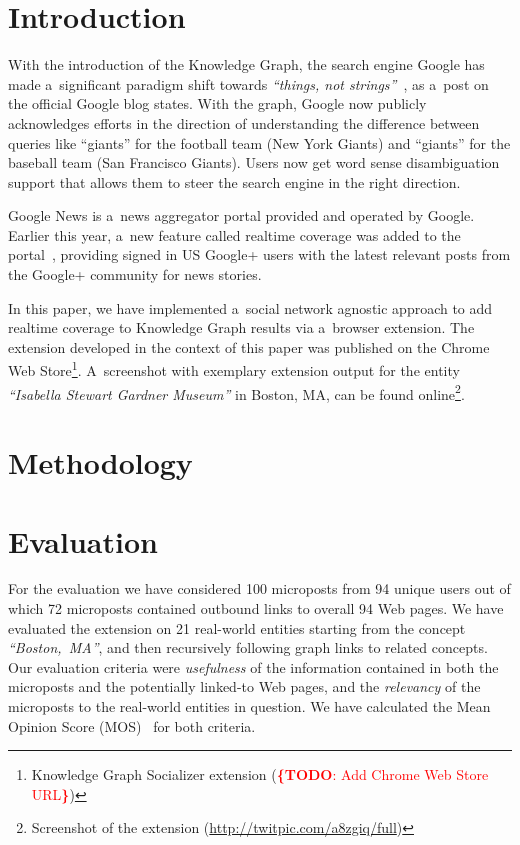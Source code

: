 \documentclass[runningheads,a4paper]{llncs}
\newcommand{\todo}[1]{\noindent\textcolor{red}{{\bf \{TODO}: #1{\bf \}}}}
\begin{document}
\section{Introduction}
With the introduction of the Knowledge Graph, the search engine Google
has made a~significant paradigm shift towards \textit{``things, not strings''}~\cite{singhal2012},
as a~post on the official Google blog states.
With the graph, Google now publicly acknowledges efforts in the direction of 
understanding the difference between queries like ``giants''
for the football team (New York Giants)
and ``giants'' for the baseball team (San Francisco Giants).
Users now get word sense disambiguation support that allows them
to steer the search engine in the right direction.

Google News is a~news aggregator portal provided and operated by Google.
Earlier this year, a~new feature called realtime coverage
was added to the portal~\cite{zuccarino2012}, providing signed in US Google+ users
with the latest relevant posts from the Google+ community for news stories.

In this paper, we have implemented a~social network agnostic approach
to add realtime coverage to Knowledge Graph results via a~browser extension.
The extension developed in the context of this paper was published
on the Chrome Web Store\footnote{Knowledge Graph Socializer extension (\todo{Add Chrome Web Store URL})}.
A~screenshot with exemplary extension output for the entity
\emph{``Isabella Stewart Gardner Museum''} in Boston, MA,
can be found online\footnote{Screenshot of the extension (\url{http://twitpic.com/a8zgiq/full})}. 

\section{Methodology}


\section{Evaluation}
For the evaluation we have considered 100 microposts from 94 unique users
out of which 72 microposts contained outbound links to overall 94 Web pages.
We have evaluated the extension on 21 real-world entities starting from the concept
\emph{``Boston,~MA''}, and then recursively following graph links to related concepts.
Our evaluation criteria were \emph{usefulness} of the information
contained in both the microposts and the potentially linked-to Web pages,
and the \emph{relevancy} of the microposts to the real-world entities in question.
We have calculated the Mean Opinion Score (MOS)~\cite{mos1998} for both criteria.
\end{document}

